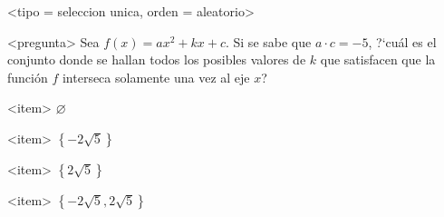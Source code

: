 <tipo = seleccion unica, orden = aleatorio>

<pregunta>
Sea $f(x)=ax^2+kx+c$. Si se sabe que $a\cdot c=-5$, ?`cu\'al es el conjunto donde se hallan todos los posibles valores de $k$ que satisfacen que la funci\'on $f$ interseca solamente una vez al eje $x$?


<item>
$\varnothing$

<item>
$\left\{-2\sqrt{5}\right\}$

<item>
$\left\{2\sqrt{5}\right\}$

<item>
$\left\{-2\sqrt{5},2\sqrt{5}\right\}$



